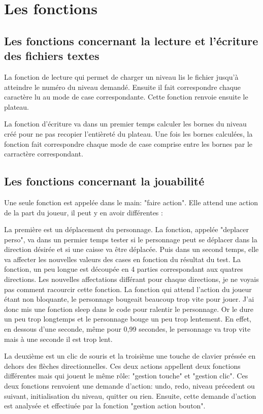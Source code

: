 \documentclass{report}
\begin{document}
	\chapter{Les fonctions}
		\section{Les fonctions concernant la lecture et l'écriture des fichiers textes}
La fonction de lecture qui permet de charger un niveau lis le fichier jusqu'à atteindre le numéro du niveau demandé. Ensuite il fait correspondre chaque caractère lu au mode de case correspondante. Cette fonction renvoie ensuite le plateau.


La fonction d'écriture va dans un premier temps calculer les bornes du niveau créé pour ne pas recopier l'entièreté du plateau. Une fois les bornes calculées, la fonction fait correspondre chaque mode de case comprise entre les bornes par le carractère correspondant. 

		\section{Les fonctions concernant la jouabilité}
Une seule fonction est appelée dans le main: "faire action". Elle attend une action de la part du joueur, il peut y en avoir différentes :


La première est un déplacement du personnage. La fonction, appelée "deplacer perso", va dans un permier temps tester si le personnage peut se déplacer dans la direction désirée et si une caisse va être déplacée.
Puis dans un second temps, elle va affecter les nouvelles valeurs des cases en fonction du résultat du test. La fonction, un peu longue est découpée en 4 parties correspondant aux quatres directions.
Les nouvelles affectations différant pour chaque directions, je ne voyais pas comment racourcir cette fonction.
La fonction qui attend l'action du joueur étant non bloquante, le personnage bougeait beaucoup trop vite pour jouer. J'ai donc mis une fonction sleep dans le code pour ralentir le personnage. Or le dure un peu trop longtemps et le personnage bouge un peu trop lentement. En effet, en dessous d'une seconde, même pour 0,99 secondes, le personnage va trop vite mais à une seconde il est trop lent.


La deuxième est un clic de souris et la troisième une touche de clavier préssée en dehors des flèches directionnelles. Ces deux actions appellent deux fonctions différentes mais qui jouent le même rôle: "gestion touche" et "gestion clic". Ces deux fonctions renvoient une demande d'action: undo, redo, niveau précedent ou suivant, initialisation du niveau, quitter ou rien.
Ensuite, cette demande d'action est analysée et effectiuée par la fonction "gestion action bouton".
	
\end{document}
